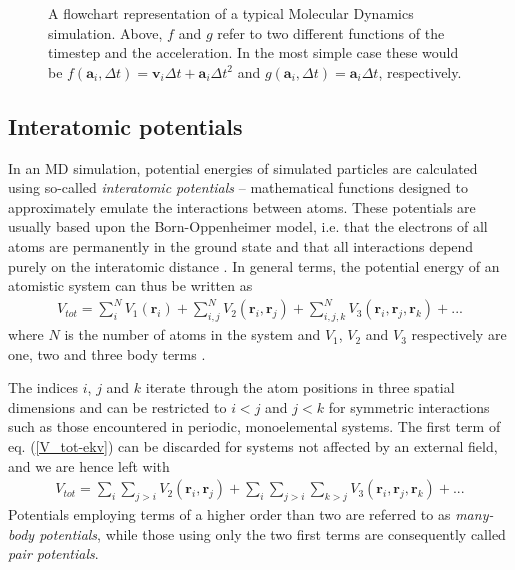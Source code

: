 \begin{figure}
\begin{center}
\endgroup
\caption{A flowchart representation of a typical Molecular Dynamics simulation. Above, $f$ and $g$ refer to two different functions of the timestep and the acceleration. In the most simple case these would be $f(\mathbf{a}_i,\Delta t) = \mathbf{v}_i\Delta t + \mathbf{a}_i\Delta t^2$ and $g(\mathbf{a}_i,\Delta t) = \mathbf{a}_i\Delta t$, respectively.} 
\label{MD-schema}
\end{center}
\end{figure}


\subsection{Interatomic potentials}

In an MD simulation, potential energies of simulated particles are calculated using so-called \textit{interatomic potentials} -- mathematical functions designed to approximately emulate the interactions between atoms. 
These potentials are usually based upon the Born-Oppenheimer model, i.e. that the electrons of all atoms are permanently in the ground state and that all interactions depend purely on the interatomic distance \cite{born1927quantentheorie}. 
In general terms, the potential energy of an atomistic system can thus be written as
\begin{align}
V_{tot} = \sum_i^N V_1(\mathbf{r}_i) + \sum_{i,j}^N V_2(\mathbf{r}_i, \mathbf{r}_j) +  \sum_{i,j,k}^N V_3(\mathbf{r}_i, \mathbf{r}_j, \mathbf{r}_k) + ...
\label{V_tot-ekv}
\end{align}
where $N$ is the number of atoms in the system and $V_1$, $V_2$ and $V_3$ respectively are one, two and three body terms \cite{potentialsTheory}.

The indices $i$, $j$ and $k$ iterate through the atom positions in three spatial dimensions and can be restricted to $i < j$ and $j < k$ for symmetric interactions such as those encountered in periodic, monoelemental systems. 
The first term of eq. (\ref{V_tot-ekv}) can be discarded for systems not affected by an external field, and we are hence left with
\begin{align}
V_{tot} = \sum_i \sum_{j>i} V_2(\mathbf{r}_i, \mathbf{r}_j) + \sum_i \sum_{j>i} \sum_{k > j} V_3(\mathbf{r}_i, \mathbf{r}_j, \mathbf{r}_k) + ...
\end{align}
Potentials employing terms of a higher order than two are referred to as \textit{many-body potentials}, while those using only the two first terms are consequently called \textit{pair potentials}.


